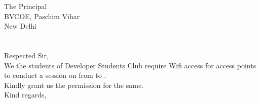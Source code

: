 \documentclass[12pt,a4paper]{article} %
\begin{document}
	

	\hspace{-8mm}
	The Principal \\
	BVCOE, Paschim Vihar\\
	New Delhi\\
	\linebreak
	\\
	\linebreak
	\textbf{}\\
	\linebreak
	Respected Sir,\\
	
	\vspace{-5mm}
	\hspace{8mm}
	We the students of Developer Students Club require Wifi access for
	access points to conduct a session on 
	from 
	to 
	.\\
	Kindly grant us the permission for the same. \\
	\linebreak
	Kind regards,\\
	\\
	
\end{document}
